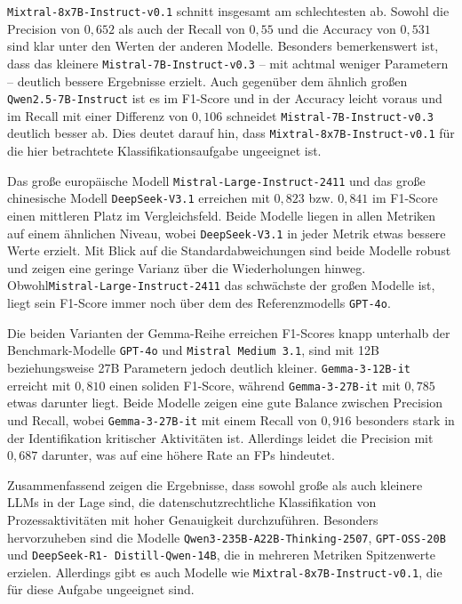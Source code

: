 \texttt{Mixtral-8x7B-Instruct-v0.1} schnitt insgesamt am schlechtesten ab. Sowohl die Precision von $0{,}652$ als auch der Recall von $0{,}55$ und die Accuracy von $0{,}531$ sind klar unter den Werten der anderen Modelle. Besonders bemerkenswert ist, dass das kleinere \texttt{Mistral-7B-Instruct-v0.3} – mit achtmal weniger Parametern – deutlich bessere Ergebnisse erzielt. Auch gegenüber dem ähnlich großen \texttt{Qwen2.5-7B-Instruct} ist es im F1-Score und in der Accuracy leicht voraus und im Recall mit einer Differenz von $0{,}106$ schneidet \texttt{Mistral-7B-Instruct-v0.3} deutlich besser ab. Dies deutet darauf hin, dass \texttt{Mixtral-8x7B-Instruct-v0.1} für die hier betrachtete Klassifikationsaufgabe ungeeignet ist.

Das große europäische Modell \texttt{Mistral-Large-Instruct-2411} und das große chinesische Modell \texttt{DeepSeek-V3.1} erreichen mit $0{,}823$ bzw. $0{,}841$ im F1-Score einen mittleren Platz im Vergleichsfeld. Beide Modelle liegen in allen Metriken auf einem ähnlichen Niveau, wobei \texttt{DeepSeek-V3.1} in jeder Metrik etwas bessere Werte erzielt. Mit Blick auf die Standardabweichungen sind beide Modelle robust und zeigen eine geringe Varianz über die Wiederholungen hinweg. Obwohl\linebreak\texttt{Mistral-Large-Instruct-2411} das schwächste der großen Modelle ist, liegt sein F1-Score immer noch über dem des Referenzmodells \texttt{GPT-4o}.

Die beiden Varianten der Gemma-Reihe erreichen F1-Scores knapp unterhalb der Benchmark-Modelle \texttt{GPT-4o} und \texttt{Mistral Medium 3.1}, sind mit 12B beziehungsweise 27B Parametern jedoch deutlich kleiner. \texttt{Gemma-3-12B-it} erreicht mit $0{,}810$ einen soliden F1-Score, während \texttt{Gemma-3-27B-it} mit $0{,}785$ etwas darunter liegt. Beide Modelle zeigen eine gute Balance zwischen Precision und Recall, wobei \texttt{Gemma-3-27B-it} mit einem Recall von $0{,}916$ besonders stark in der Identifikation kritischer Aktivitäten ist. Allerdings leidet die Precision mit $0{,}687$ darunter, was auf eine höhere Rate an \acp{FP} hindeutet.

Zusammenfassend zeigen die Ergebnisse, dass sowohl große als auch kleinere \acp{LLM} in der Lage sind, die datenschutzrechtliche Klassifikation von Prozessaktivitäten mit hoher Genauigkeit durchzuführen. Besonders hervorzuheben sind die Modelle \texttt{Qwen3-235B-A22B-Thinking-2507}, \texttt{GPT-OSS-20B} und \texttt{DeepSeek-R1-\linebreak~Distill-Qwen-14B}, die in mehreren Metriken Spitzenwerte erzielen. Allerdings gibt es auch Modelle wie \texttt{Mixtral-8x7B-Instruct-v0.1}, die für diese Aufgabe ungeeignet sind.
